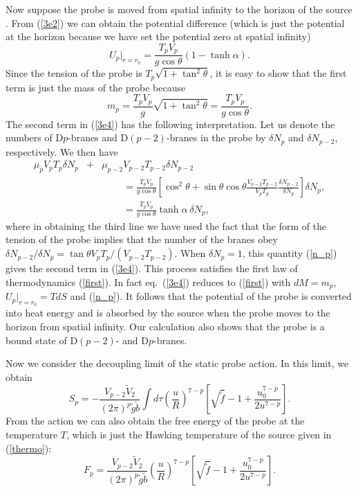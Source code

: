 \documentclass[a4paper,12pt]{article}
\begin{document}
Now suppose the probe is moved from  spatial infinity to the horizon
of the source \cite{KT}. From (\ref{3e2}) we can obtain the potential
difference (which is just the potential at the horizon because we have set
the potential zero at spatial infinity)
\begin{equation}
\label{3e4}
U_p|_{r=r_0}= \frac{T_p V_p}{g\cos\theta}\left (1-\tanh\alpha \right ).
\end{equation}
Since the tension of the probe is $T_p\sqrt{1+\tan^2\theta}$,
it is easy to show that the first term is just the mass of the probe because
\begin{equation}
m_p=\frac{T_pV_p}{g}\sqrt{1+\tan^2\theta}=\frac{T_pV_p}{g\cos\theta}.
\end{equation}
The second term in (\ref{3e4}) has the following interpretation. Let us
denote the numbers of D$p$-branes and D$(p-2)$-branes in the probe by
$\delta N_p$ and $\delta N_{p-2}$, respectively. We then have
\begin{eqnarray}
\mu_p V_pT_p \delta N_p &+& \mu_{p-2}V_{p-2}T_{p-2}\delta N_{p-2}
         \nonumber\\
 &&~~~~~~~~~~= \frac{T_p V_p}{g\cos\theta}\left [\cos^2\theta +
   \sin\theta \cos\theta \frac{V_{p-2}T_{p-2}}{V_pT_p}
    \frac{\delta N_{p-2}}{\delta N_p}\right] \delta N_p, \nonumber \\
\label{n_p}
 &&~~~~~~~~~~= \frac{T_pV_p}{g\cos\theta}\tanh\alpha~\delta N_p,
\end{eqnarray}
where in obtaining the third line we have used the fact that the form of the
tension of the probe implies that the number of the branes obey
$\delta N_{p-2}/\delta N_p=\tan\theta V_pT_p/(V_{p-2}T_{p-2})$. When
$\delta N_p=1$, this quantity (\ref{n_p}) gives the second term in
(\ref{3e4}). This process satisfies the first law of thermodynamics
(\ref{first}). In fact eq.~(\ref{3e4}) reduces to (\ref{first}) with $dM=m_p$,
$U_p|_{r=r_0}= TdS$ and (\ref{n_p}). It follows that the potential of the
probe is converted into heat energy and is absorbed by the source when the
probe moves to the horizon from  spatial infinity. Our calculation also
shows that the probe is a bound state of D$(p-2)$- and D$p$-branes.

Now we consider the decoupling limit of the static probe action. In this
limit, we obtain
\begin{equation}
\label{3e7}
S_p=-\frac{V_{p-2}\tilde{V}_2}{(2\pi)^p\tilde{g}\tilde{b}}\int d\tau
  \left(\frac{u}{R}\right)^{7-p}\left[\sqrt{\tilde{f}}-1+
    \frac{u_0^{7-p}}{2u^{7-p}}\right].
\end{equation}
{}From the action we can also obtain the free energy of the probe at the
temperature $T$, which is just the Hawking temperature of the source given
in (\ref{thermo}):
\begin{equation}
\label{3e8}
F_p=\frac{V_{p-2}\tilde{V}_2}{(2\pi)^p\tilde{g}\tilde{b}}
  \left(\frac{u}{R}\right)^{7-p}\left[\sqrt{\tilde{f}}-1+
    \frac{u_0^{7-p}}{2u^{7-p}}\right].
\end{equation}
\end{document}
